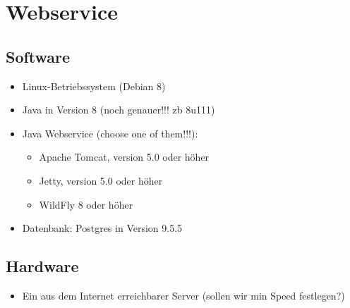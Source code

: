 \section{Webservice}
\subsection{Software}
\begin{itemize} 
\item Linux-Betriebssystem (Debian 8)
\item Java in Version 8 (noch genauer!!! zb 8u111)
\item Java Webservice (choose one of them!!!):
	\begin{itemize}
		\item Apache Tomcat, version 5.0 oder h\"oher
    		\item Jetty, version 5.0 oder h\"oher
    		\item WildFly 8 oder h\"oher
	\end{itemize}
\item Datenbank: Postgres in Version 9.5.5
\end{itemize}
\subsection{Hardware}
\begin{itemize} 
\item Ein aus dem Internet erreichbarer Server (sollen wir min Speed festlegen?)
\end{itemize}